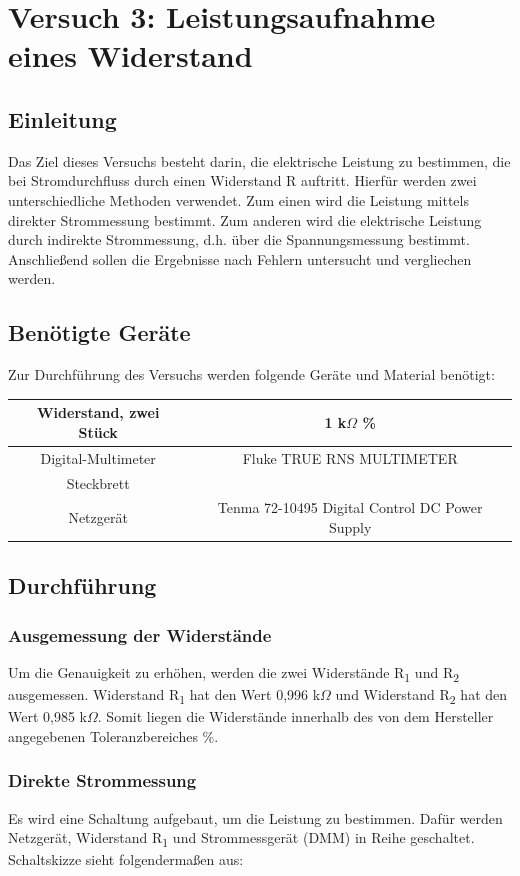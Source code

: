\chapter{Versuch 3: Leistungsaufnahme eines Widerstand}

\section{Einleitung}
Das Ziel dieses Versuchs besteht darin, die elektrische Leistung zu bestimmen,
die bei Stromdurchfluss durch einen Widerstand R auftritt. Hierfür werden zwei 
unterschiedliche Methoden verwendet. Zum einen wird die Leistung mittels 
direkter Strommessung bestimmt. Zum anderen wird die elektrische Leistung durch
indirekte Strommessung, d.h. über die Spannungsmessung bestimmt. Anschließend 
sollen die Ergebnisse nach Fehlern untersucht und vergliechen werden.

\section{Benötigte Geräte}
Zur Durchführung des Versuchs werden folgende Geräte und Material benötigt:

\begin{tabular}[h]{c|c}
	Widerstand, zwei Stück & 1 k$\Omega$ \textpm 5\% \\
    \hline
    Digital-Multimeter & Fluke TRUE RNS MULTIMETER\\
    \hline
    Steckbrett & \\
    \hline
    Netzgerät & Tenma 72-10495 Digital Control DC Power Supply
    \label{tab:Versuch 3: Geräte}
\end{tabular}

\section{Durchführung}
\subsection{Ausgemessung der Widerstände}
Um die Genauigkeit zu erhöhen, werden die zwei Widerstände R\textsubscript{1}
und R\textsubscript{2} ausgemessen. Widerstand R\textsubscript{1} hat den 
Wert 0,996 k$\Omega$ und Widerstand R\textsubscript{2} hat den Wert 0,985 
k$\Omega$. Somit liegen die Widerstände innerhalb des von dem Hersteller
angegebenen Toleranzbereiches \%. 

\subsection{Direkte Strommessung}
Es wird eine Schaltung aufgebaut, um die Leistung zu bestimmen. Dafür werden
Netzgerät, Widerstand R\textsubscript{1} und Strommessgerät (DMM) in Reihe
geschaltet. Schaltskizze sieht folgendermaßen aus:


